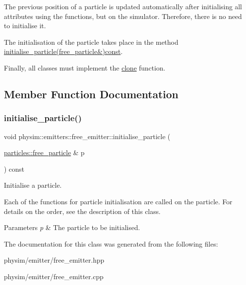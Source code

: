The previous position of a particle is updated automatically after initialising all attributes using the functions, but on the simulator. Therefore, there is no need to initialise it.

The initialisation of the particle takes place in the method \hyperlink{classphysim_1_1emitters_1_1free__emitter_a6cdf0656c3951792b902cfbafd5ed79d}{initialise\+\_\+particle(free\+\_\+particle\&)const}.

Finally, all classes must implement the \hyperlink{classphysim_1_1emitters_1_1free__emitter_a7b731506d65270400b197428a63f2eb1}{clone} function. 

\subsection{Member Function Documentation}
\mbox{\label{classphysim_1_1emitters_1_1free__emitter_a6cdf0656c3951792b902cfbafd5ed79d}} 
\subsubsection{\texorpdfstring{initialise\+\_\+particle()}{initialise\_particle()}}
{\footnotesize\ttfamily void physim\+::emitters\+::free\+\_\+emitter\+::initialise\+\_\+particle (\begin{DoxyParamCaption}\item[{\hyperlink{classphysim_1_1particles_1_1free__particle}{particles\+::free\+\_\+particle} \&}]{p }\end{DoxyParamCaption}) const}



Initialise a particle. 

Each of the functions for particle initialisation are called on the particle. For details on the order, see the description of this class. 
\begin{DoxyParams}{Parameters}
{\em p} & The particle to be initialised. \\
\hline
\end{DoxyParams}


The documentation for this class was generated from the following files\+:\begin{DoxyCompactItemize}
\item 
physim/emitter/free\+\_\+emitter.\+hpp\item 
physim/emitter/free\+\_\+emitter.\+cpp\end{DoxyCompactItemize}
